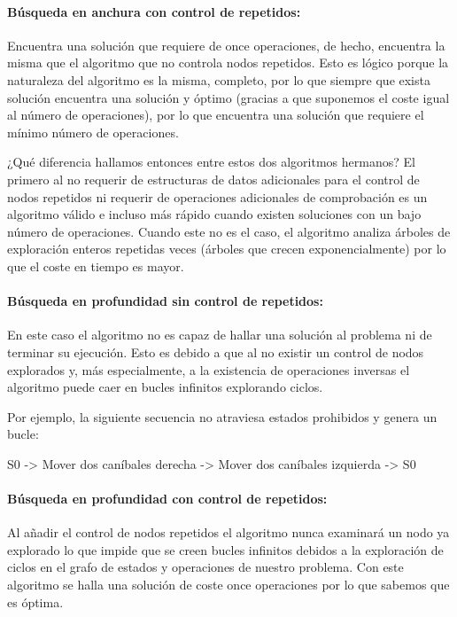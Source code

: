 \documentclass[11pt]{article}
\begin{document}
    \paragraph{Búsqueda en anchura con control de
repetidos:}\label{buxfasqueda-en-anchura-con-control-de-repetidos}

Encuentra una solución que requiere de once operaciones, de hecho,
encuentra la misma que el algoritmo que no controla nodos repetidos.
Esto es lógico porque la naturaleza del algoritmo es la misma, completo,
por lo que siempre que exista solución encuentra una solución y óptimo
(gracias a que suponemos el coste igual al número de operaciones), por
lo que encuentra una solución que requiere el mínimo número de
operaciones.

¿Qué diferencia hallamos entonces entre estos dos algoritmos hermanos?
El primero al no requerir de estructuras de datos adicionales para el
control de nodos repetidos ni requerir de operaciones adicionales de
comprobación es un algoritmo válido e incluso más rápido cuando existen
soluciones con un bajo número de operaciones. Cuando este no es el caso,
el algoritmo analiza árboles de exploración enteros repetidas veces
(árboles que crecen exponencialmente) por lo que el coste en tiempo es
mayor.

    \paragraph{Búsqueda en profundidad sin control de
repetidos:}\label{buxfasqueda-en-profundidad-sin-control-de-repetidos}

En este caso el algoritmo no es capaz de hallar una solución al problema
ni de terminar su ejecución. Esto es debido a que al no existir un
control de nodos explorados y, más especialmente, a la existencia de
operaciones inversas el algoritmo puede caer en bucles infinitos
explorando ciclos.

Por ejemplo, la siguiente secuencia no atraviesa estados prohibidos y
genera un bucle:

S0 -\textgreater{} Mover dos caníbales derecha -\textgreater{} Mover dos
caníbales izquierda -\textgreater{} S0

    \paragraph{Búsqueda en profundidad con control de
repetidos:}\label{buxfasqueda-en-profundidad-con-control-de-repetidos}

Al añadir el control de nodos repetidos el algoritmo nunca examinará un
nodo ya explorado lo que impide que se creen bucles infinitos debidos a
la exploración de ciclos en el grafo de estados y operaciones de nuestro
problema. Con este algoritmo se halla una solución de coste once
operaciones por lo que sabemos que es óptima.
\end{document}

